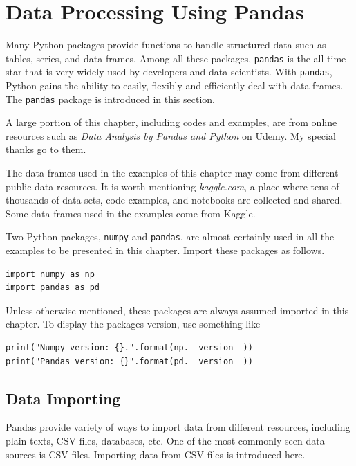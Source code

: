 \chapter{Data Processing Using Pandas} \label{ch:pandas}

Many Python packages provide functions to handle structured data such as tables, series, and data frames. Among all these packages, \verb|pandas| is the all-time star that is very widely used by developers and data scientists. With \verb|pandas|, Python gains the ability to easily, flexibly and efficiently deal with data frames. The \verb|pandas| package is introduced in this section.

A large portion of this chapter, including codes and examples, are from online resources such as \textit{Data Analysis by Pandas and Python} on Udemy. My special thanks go to them.

The data frames used in the examples of this chapter may come from different public data resources. It is worth mentioning \textit{kaggle.com}, a place where tens of thousands of data sets, code examples, and notebooks are collected and shared. Some data frames used in the examples come from Kaggle.

Two Python packages, \verb|numpy| and \verb|pandas|, are almost certainly used in all the examples to be presented in this chapter. Import these packages as follows.
\begin{lstlisting}
import numpy as np
import pandas as pd
\end{lstlisting}
Unless otherwise mentioned, these packages are always assumed imported in this chapter. To display the packages version, use something like
\begin{lstlisting}
print("Numpy version: {}.".format(np.__version__))
print("Pandas version: {}".format(pd.__version__))
\end{lstlisting}

\section{Data Importing}

Pandas provide variety of ways to import data from different resources, including plain texts, CSV files, databases, etc. One of the most commonly seen data sources is CSV files. Importing data from CSV files is introduced here.

